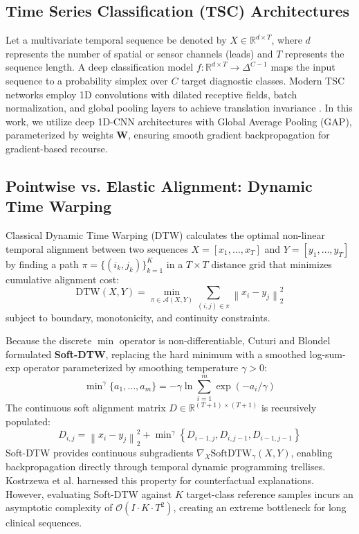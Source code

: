 \documentclass[conference]{IEEEtran}
\newcommand{\R}{\mathbb{R}}
\newcommand{\norm}[1]{\left\lVert#1\right\rVert}
\begin{document}
\subsection{Time Series Classification (TSC) Architectures}
Let a multivariate temporal sequence be denoted by $X \in \R^{d \times T}$, where $d$ represents the number of spatial or sensor channels (leads) and $T$ represents the sequence length. A deep classification model $f: \R^{d \times T} \to \Delta^{C-1}$ maps the input sequence to a probability simplex over $C$ target diagnostic classes. Modern TSC networks employ 1D convolutions with dilated receptive fields, batch normalization, and global pooling layers to achieve translation invariance \cite{ismail2019deep}. In this work, we utilize deep 1D-CNN architectures with Global Average Pooling (GAP), parameterized by weights $\mathbf{W}$, ensuring smooth gradient backpropagation for gradient-based recourse.

\subsection{Pointwise vs. Elastic Alignment: Dynamic Time Warping}
Classical Dynamic Time Warping (DTW) calculates the optimal non-linear temporal alignment between two sequences $X = [x_1, \dots, x_T]$ and $Y = [y_1, \dots, y_T]$ by finding a path $\pi = \{ (i_k, j_k) \}_{k=1}^K$ in a $T \times T$ distance grid that minimizes cumulative alignment cost:
\begin{equation}
    \text{DTW}(X, Y) = \min_{\pi \in \mathcal{A}(X, Y)} \sum_{(i, j) \in \pi} \norm{x_i - y_j}_2^2
\end{equation}
subject to boundary, monotonicity, and continuity constraints.

Because the discrete $\min$ operator is non-differentiable, Cuturi and Blondel \cite{cuturi2017soft} formulated \textbf{Soft-DTW}, replacing the hard minimum with a smoothed log-sum-exp operator parameterized by smoothing temperature $\gamma > 0$:
\begin{equation}
    \min\nolimits^\gamma \{a_1, \dots, a_m\} = -\gamma \ln \sum_{i=1}^m \exp(-a_i / \gamma)
\end{equation}
The continuous soft alignment matrix $D \in \R^{(T+1) \times (T+1)}$ is recursively populated:
\begin{equation}
    D_{i,j} = \norm{x_i - y_j}_2^2 + \min\nolimits^\gamma \left\{ D_{i-1, j}, D_{i, j-1}, D_{i-1, j-1} \right\}
\end{equation}
Soft-DTW provides continuous subgradients $\nabla_X \text{SoftDTW}_\gamma(X, Y)$, enabling backpropagation directly through temporal dynamic programming trellises. Kostrzewa et al. \cite{kostrzewa2026softdtw} harnessed this property for counterfactual explanations. However, evaluating Soft-DTW against $K$ target-class reference samples incurs an asymptotic complexity of $\mathcal{O}(I \cdot K \cdot T^2)$, creating an extreme bottleneck for long clinical sequences.
\end{document}
